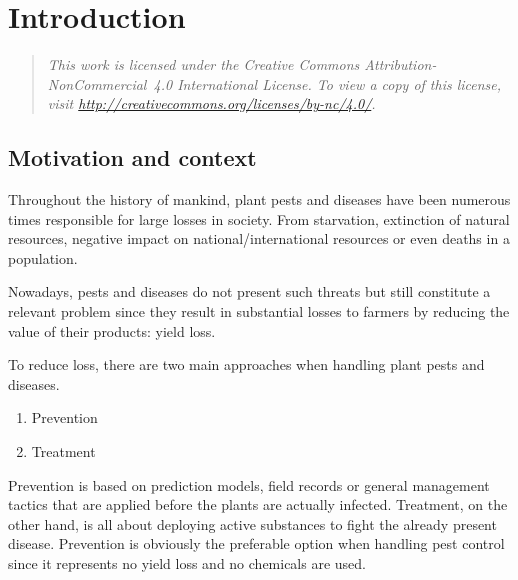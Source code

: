 \newcommand{\novathesis}{\emph{novathesis}}
\newcommand{\novathesisclass}{\texttt{novathesis.cls}}


\chapter{Introduction}
\label{cha:introduction}

\begin{quotation}
  \itshape
  This work is licensed under the Creative Commons Attribution-NonCommercial~4.0 International License.
  To view a copy of this license, visit \url{http://creativecommons.org/licenses/by-nc/4.0/}.
\end{quotation}

\section{Motivation and context} %
\label{sec:motivation_and_content}

Throughout the history of mankind, plant pests and diseases have been numerous times responsible for large losses in society. From starvation, extinction of natural resources, negative impact on national/international resources or even deaths in a population.

Nowadays, pests and diseases do not present such threats but still constitute a relevant problem since they result in substantial losses to farmers by reducing the value of their products: yield loss. 

To reduce loss, there are two main approaches when handling plant pests and diseases.

\begin{enumerate}
	\item Prevention
	\item Treatment
\end{enumerate}

Prevention is based on prediction models, field records or general management tactics that are applied before the plants are actually infected. Treatment, on the other hand, is all about deploying active substances to fight the already present disease. Prevention is obviously the preferable option when handling pest control since it represents no yield loss and no chemicals are used.

